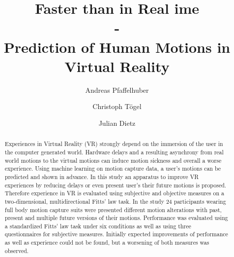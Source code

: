 \documentclass[sigconf]{acmart}
\begin{document}
\title{Faster than in Real ime \\
- \\
Prediction of Human Motions in Virtual Reality }

\author{Andreas Pfaffelhuber}

\author{Christoph Tögel}

\author{Julian Dietz}

\renewcommand{\shortauthors}{Pfaffelhuber, Tögel \& Dietz}

\begin{abstract}
Experiences in Virtual Reality (VR) strongly depend on the immersion of the user in the computer generated world.
Hardware delays and a resulting asynchrony from real world motions to the virtual motions can induce motion sickness and overall a worse experience.
Using machine learning on motion capture data, a user's motions can be predicted and shown in advance.
In this study an apparatus to improve VR experiences by reducing delays or even present user's their future motions is proposed.
Therefore experience in VR is evaluated using subjective and objective measures on a two-dimensional, multidirectional Fitts' law task.
In the study 24 participants wearing full body motion capture suits were presented different motion alterations with past, present and multiple future versions of their motions.
Performance was evaluated using a standardized Fitts' law task under six conditions as well as using three questionnaires for subjective measures. 
Initially expected improvements of performance as well as experience could not be found, but a worsening of both measures was observed.
\end{abstract}
\end{document}
